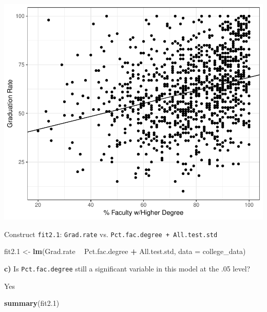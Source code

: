 \documentclass[]{article}
\newenvironment{Shaded}{\begin{snugshade}}{\end{snugshade}}
\newcommand{\KeywordTok}[1]{\textcolor[rgb]{0.13,0.29,0.53}{\textbf{#1}}}
\newcommand{\DataTypeTok}[1]{\textcolor[rgb]{0.13,0.29,0.53}{#1}}
\newcommand{\DecValTok}[1]{\textcolor[rgb]{0.00,0.00,0.81}{#1}}
\newcommand{\StringTok}[1]{\textcolor[rgb]{0.31,0.60,0.02}{#1}}
\newcommand{\OperatorTok}[1]{\textcolor[rgb]{0.81,0.36,0.00}{\textbf{#1}}}
\newcommand{\NormalTok}[1]{#1}
\begin{document}
\begin{flushleft}\includegraphics{Midterm_11_01_2016_Answers_files/figure-latex/unnamed-chunk-21-1} \end{flushleft}

\vspace{.1in}

Construct \texttt{fit2.1}: \texttt{Grad.rate} vs.
\texttt{Pct.fac.degree\ +\ All.test.std}

\begin{Shaded}
\begin{Highlighting}[]
\NormalTok{fit2.}\DecValTok{1}\NormalTok{ <-}\StringTok{ }\KeywordTok{lm}\NormalTok{(Grad.rate }\OperatorTok{~}\StringTok{ }\NormalTok{Pct.fac.degree }\OperatorTok{+}\StringTok{ }\NormalTok{All.test.std, }\DataTypeTok{data =}\NormalTok{ college_data)}
\end{Highlighting}
\end{Shaded}

\textbf{c)} Is \texttt{Pct.fac.degree} still a significant variable in
this model at the .05 level?

Yes

\begin{Shaded}
\begin{Highlighting}[]
\KeywordTok{summary}\NormalTok{(fit2.}\DecValTok{1}\NormalTok{)}
\end{Highlighting}
\end{Shaded}
\end{document}
